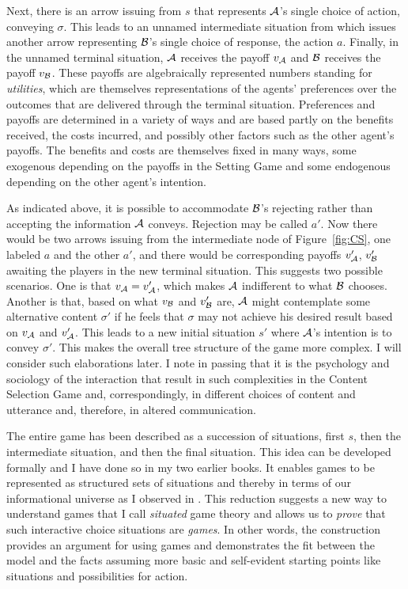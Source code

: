 Next, there is an arrow issuing from $s$ that represents $\cal A$'s single choice of action, conveying $\sigma$. This leads to an unnamed intermediate situation from which issues another arrow representing $\cal B$'s single choice of response, the action $a$. Finally, in the unnamed terminal situation, $\cal A$ receives the payoff $v_{\cal A}$ and $\cal B$ receives the payoff $v_{\cal B}$. These payoffs are algebraically represented numbers standing for \emph{utilities}, which are themselves representations of the agents' preferences over the outcomes that are delivered through the terminal situation. Preferences and payoffs are determined in a variety of ways and are based partly on the benefits received, the costs incurred, and possibly other factors such as the other agent's payoffs. The benefits and costs are themselves fixed in many ways, some exogenous depending on the payoffs in the Setting Game and some endogenous depending on the other agent's intention.

As indicated above, it is possible to accommodate $\cal B$'s rejecting rather than accepting the information $\cal A$ conveys. Rejection may be called $a'$. Now there would be two arrows issuing from the intermediate node of Figure~\ref{fig:CS}, one labeled $a$ and the other $a'$, and there would be corresponding payoffs $v'_{\cal A}$, $v'_{\cal B}$ awaiting the players in the new terminal situation. This suggests two possible scenarios. One is that $v_{\cal A} = v'_{\cal A}$, which makes $\cal A$ indifferent to what $\cal B$ chooses. Another is that, based on what $v_{\cal B}$ and $v'_{\cal B}$ are, $\cal A$ might contemplate some alternative content $\sigma'$ if he feels that $\sigma$ may not achieve his desired result based on $v_{\cal A}$ and $v'_{\cal A}$. This leads to a new initial situation $s'$ where $\cal A$'s intention is to convey $\sigma'$. This makes the overall tree structure of the game more complex. I will consider such elaborations later. I note in passing that it is the psychology and sociology of the interaction that result in such complexities in the Content Selection Game and, correspondingly, in different choices of content and utterance and, therefore, in altered communication.

The entire game has been described as a succession of situations, first $s$, then the intermediate situation, and then the final situation. This idea can be developed formally and I have done so in my two earlier books. It enables games to be represented as structured sets of situations and thereby in terms of our informational universe as I observed in . This reduction suggests a new way to understand games that I call \emph{situated} game theory and allows us to \emph{prove} that such interactive choice situations are \emph{games}. In other words, the construction provides an argument for using games and demonstrates the fit between the model and the facts assuming more basic and self-evident starting points like situations and possibilities for action. 

